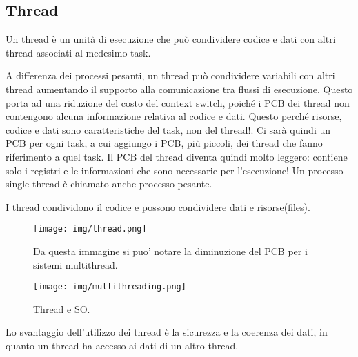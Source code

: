 \documentclass{article}
\begin{document}
\subsection{Thread}
Un thread è un unità di esecuzione che può condividere codice e dati con altri
thread associati al medesimo task.
\medskip

\noindent{}
\medskip

\noindent A differenza dei processi pesanti, un thread può condividere 
variabili con altri thread aumentando il supporto alla comunicazione tra
flussi di esecuzione. Questo porta ad una riduzione del costo del context 
switch, poiché i PCB dei thread non contengono alcuna informazione relativa
al codice e dati. Questo perché risorse, codice e dati sono caratteristiche 
del task, non del thread!. Ci sarà quindi un PCB per ogni task,
a cui aggiungo i PCB, più piccoli, dei thread che fanno riferimento a quel task.
Il PCB del thread diventa quindi molto leggero: contiene solo i registri e le
informazioni che sono necessarie per l'esecuzione!
Un processo single-thread è chiamato anche processo pesante.

\noindent I thread condividono il codice e possono condividere
dati e risorse(files).

\begin{figure}[h!]
    \begin{center}
        \texttt{[image: img/thread.png]}
        \caption{Da questa immagine si puo' notare
        la diminuzione del PCB per i sistemi multithread.}
    \end{center}
\end{figure}

\begin{figure}[h!]
    \begin{center}
        \texttt{[image: img/multithreading.png]}
        \caption{Thread e SO.}
    \end{center}
\end{figure}

\noindent Lo svantaggio dell'utilizzo dei thread 
è la sicurezza e la coerenza dei dati, in quanto un thread ha accesso ai
dati di un altro thread.
\end{document}
